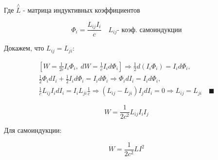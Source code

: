 Где \(\overset{\wedge}{L}\) - матрица индуктивных коэффициентов

\[
\Phi_i= \frac{L_{ij}I_i}{c} \quad L_{ij}\text{- коэф. самоиндукции} 
\]

Докажем, что \(  L_{ij}=L_{ji} \):

\begin{gather*}
    \left[ W = \frac{1}{2c}I_i\Phi_i, \; dW = \frac{1}{c}I_i d\Phi_i \right] 
    \Rightarrow \frac{1}{2}d(I_i\Phi_i) = I_i d\Phi_i, \\
    \frac{1}{2}\Phi_i dI_i + \frac{1}{2}I_i d\Phi_i = I_i d\Phi_i 
    \Rightarrow \Phi_i dI_i = I_i d\Phi_i, \\
    \frac{1}{c}L_{ij}I_idI_i=I_iL_{ji}\frac{1}{c}
    \Rightarrow (L_{ij}-L_{ji})I_jdI_i=0 \Rightarrow L_{ij}=L_{ji} \quad \blacksquare 
\end{gather*}

\[
W=\frac{1}{2c^2}L_{ij}I_iI_j 
\]

Для самоиндукции:

\[
W=\frac{1}{2c^2}LI^2 
\]